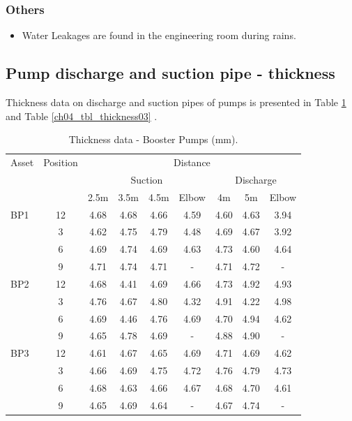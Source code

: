 \subsubsection{Others}
\begin{itemize}
	\item Water Leakages are found in the engineering room during rains.
\end{itemize}

\subsection{Pump discharge and suction pipe - thickness} \label{ch04mech01}
Thickness data on discharge and suction pipes of pumps is presented in Table \ref{ch04_tbl_thickness02} and Table \ref{ch04_tbl_thickness03} .


\begin{table}[h]
	\caption{Thickness data - Booster Pumps (mm).}
	\label{ch04_tbl_thickness02}
	{\footnotesize
\begin{tabular}{l|c|c|c|c|c|c|c|c}
	\hline
	Asset & Position & \multicolumn{7}{c}{Distance} \\ 
	\cline{3-9}
	&  & \multicolumn{4}{c|}{Suction} & \multicolumn{3}{c}{Discharge} \\ 
	\cline{3-9}
	&  & 2.5m & 3.5m & 4.5m & Elbow & 4m & 5m & Elbow \\ 
	\hline
	BP1 & 12 & 4.68 & 4.68 & 4.66 & 4.59 & 4.60 & 4.63 & 3.94 \\ 
	& 3 & 4.62 & 4.75 & 4.79 & 4.48 & 4.69 & 4.67 & 3.92 \\ 
	& 6 & 4.69 & 4.74 & 4.69 & 4.63 & 4.73 & 4.60 & 4.64 \\ 
	& 9 & 4.71 & 4.74 & 4.71 & - & 4.71 & 4.72 & - \\ 
	\hline
	BP2 & 12 & 4.68 & 4.41 & 4.69 & 4.66 & 4.73 & 4.92 & 4.93 \\ 
	& 3 & 4.76 & 4.67 & 4.80 & 4.32 & 4.91 & 4.22 & 4.98 \\ 
	& 6 & 4.69 & 4.46 & 4.76 & 4.69 & 4.70 & 4.94 & 4.62 \\ 
	& 9 & 4.65 & 4.78 & 4.69 & - & 4.88 & 4.90 & - \\ 
	\hline
	BP3 & 12 & 4.61 & 4.67 & 4.65 & 4.69 & 4.71 & 4.69 & 4.62 \\ 
	& 3 & 4.66 & 4.69 & 4.75 & 4.72 & 4.76 & 4.79 & 4.73 \\ 
	& 6 & 4.68 & 4.63 & 4.66 & 4.67 & 4.68 & 4.70 & 4.61 \\ 
	& 9 & 4.65 & 4.69 & 4.64 & - & 4.67 & 4.74 & - \\ 

\end{tabular}}
\end{table}
